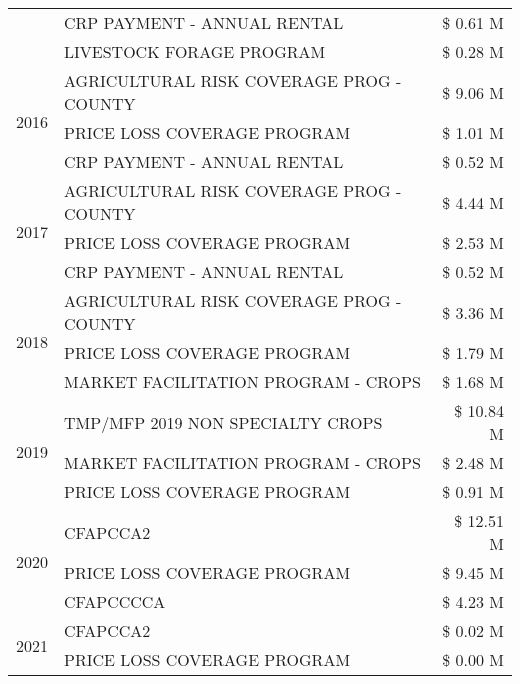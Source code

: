 \begin{tabular}{llr}
 & CRP PAYMENT - ANNUAL RENTAL & \$ 0.61 M \\
 & LIVESTOCK FORAGE PROGRAM & \$ 0.28 M \\
\cline{1-3}
\multirow[t]{3}{*}{2016} & AGRICULTURAL RISK COVERAGE PROG - COUNTY & \$ 9.06 M \\
 & PRICE LOSS COVERAGE PROGRAM & \$ 1.01 M \\
 & CRP PAYMENT - ANNUAL RENTAL & \$ 0.52 M \\
\cline{1-3}
\multirow[t]{3}{*}{2017} & AGRICULTURAL RISK COVERAGE PROG - COUNTY & \$ 4.44 M \\
 & PRICE LOSS COVERAGE PROGRAM & \$ 2.53 M \\
 & CRP PAYMENT - ANNUAL RENTAL & \$ 0.52 M \\
\cline{1-3}
\multirow[t]{3}{*}{2018} & AGRICULTURAL RISK COVERAGE PROG - COUNTY & \$ 3.36 M \\
 & PRICE LOSS COVERAGE PROGRAM & \$ 1.79 M \\
 & MARKET FACILITATION PROGRAM - CROPS & \$ 1.68 M \\
\cline{1-3}
\multirow[t]{3}{*}{2019} & TMP/MFP 2019 NON SPECIALTY CROPS & \$ 10.84 M \\
 & MARKET FACILITATION PROGRAM - CROPS & \$ 2.48 M \\
 & PRICE LOSS COVERAGE PROGRAM & \$ 0.91 M \\
\cline{1-3}
\multirow[t]{3}{*}{2020} & CFAPCCA2 & \$ 12.51 M \\
 & PRICE LOSS COVERAGE PROGRAM & \$ 9.45 M \\
 & CFAPCCCCA & \$ 4.23 M \\
\cline{1-3}
\multirow[t]{2}{*}{2021} & CFAPCCA2 & \$ 0.02 M \\
 & PRICE LOSS COVERAGE PROGRAM & \$ 0.00 M \\
\cline{1-3}
\bottomrule
\end{tabular}
